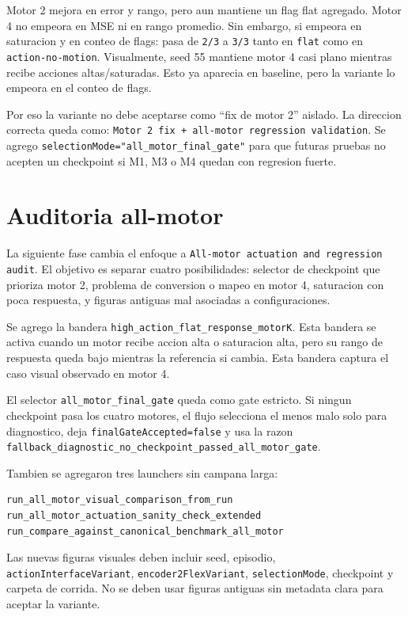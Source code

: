\documentclass[11pt]{article}
\begin{document}
Motor 2 mejora en error y rango, pero aun mantiene un flag flat agregado.
Motor 4 no empeora en MSE ni en rango promedio. Sin embargo, si empeora en
saturacion y en conteo de flags: pasa de \texttt{2/3} a \texttt{3/3} tanto
en \texttt{flat} como en \texttt{action-no-motion}. Visualmente, seed 55
mantiene motor 4 casi plano mientras recibe acciones altas/saturadas. Esto
ya aparecia en baseline, pero la variante lo empeora en el conteo de flags.

Por eso la variante no debe aceptarse como ``fix de motor 2'' aislado. La
direccion correcta queda como: \texttt{Motor 2 fix + all-motor regression
validation}. Se agrego \texttt{selectionMode="all\_motor\_final\_gate"} para
que futuras pruebas no acepten un checkpoint si M1, M3 o M4 quedan con
regresion fuerte.

\section{Auditoria all-motor}

La siguiente fase cambia el enfoque a \texttt{All-motor actuation and
regression audit}. El objetivo es separar cuatro posibilidades: selector de
checkpoint que prioriza motor 2, problema de conversion o mapeo en motor 4,
saturacion con poca respuesta, y figuras antiguas mal asociadas a
configuraciones.

Se agrego la bandera \texttt{high\_action\_flat\_response\_motorK}. Esta
bandera se activa cuando un motor recibe accion alta o saturacion alta,
pero su rango de respuesta queda bajo mientras la referencia si cambia. Esta
bandera captura el caso visual observado en motor 4.

El selector \texttt{all\_motor\_final\_gate} queda como gate estricto. Si
ningun checkpoint pasa los cuatro motores, el flujo selecciona el menos malo
solo para diagnostico, deja \texttt{finalGateAccepted=false} y usa la razon
\texttt{fallback\_diagnostic\_no\_checkpoint\_passed\_all\_motor\_gate}.

Tambien se agregaron tres launchers sin campana larga:

\begin{verbatim}
run_all_motor_visual_comparison_from_run
run_all_motor_actuation_sanity_check_extended
run_compare_against_canonical_benchmark_all_motor
\end{verbatim}

Las nuevas figuras visuales deben incluir seed, episodio,
\texttt{actionInterfaceVariant}, \texttt{encoder2FlexVariant},
\texttt{selectionMode}, checkpoint y carpeta de corrida. No se deben usar
figuras antiguas sin metadata clara para aceptar la variante.
\end{document}
